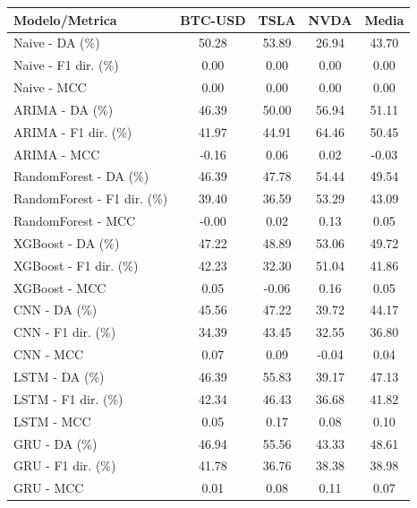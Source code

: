 \begin{tabular}{l|ccc|c}
\hline
\textbf{Modelo/Metrica} & \textbf{BTC-USD} & \textbf{TSLA} & \textbf{NVDA} & \textbf{Media} \\
\hline
Naive - DA (\%) & 50.28 & 53.89 & 26.94 & 43.70 \\
Naive - F1 dir. (\%) & 0.00 & 0.00 & 0.00 & 0.00 \\
Naive - MCC & 0.00 & 0.00 & 0.00 & 0.00 \\
ARIMA - DA (\%) & 46.39 & 50.00 & 56.94 & 51.11 \\
ARIMA - F1 dir. (\%) & 41.97 & 44.91 & 64.46 & 50.45 \\
ARIMA - MCC & -0.16 & 0.06 & 0.02 & -0.03 \\
RandomForest - DA (\%) & 46.39 & 47.78 & 54.44 & 49.54 \\
RandomForest - F1 dir. (\%) & 39.40 & 36.59 & 53.29 & 43.09 \\
RandomForest - MCC & -0.00 & 0.02 & 0.13 & 0.05 \\
XGBoost - DA (\%) & 47.22 & 48.89 & 53.06 & 49.72 \\
XGBoost - F1 dir. (\%) & 42.23 & 32.30 & 51.04 & 41.86 \\
XGBoost - MCC & 0.05 & -0.06 & 0.16 & 0.05 \\
CNN - DA (\%) & 45.56 & 47.22 & 39.72 & 44.17 \\
CNN - F1 dir. (\%) & 34.39 & 43.45 & 32.55 & 36.80 \\
CNN - MCC & 0.07 & 0.09 & -0.04 & 0.04 \\
LSTM - DA (\%) & 46.39 & 55.83 & 39.17 & 47.13 \\
LSTM - F1 dir. (\%) & 42.34 & 46.43 & 36.68 & 41.82 \\
LSTM - MCC & 0.05 & 0.17 & 0.08 & 0.10 \\
GRU - DA (\%) & 46.94 & 55.56 & 43.33 & 48.61 \\
GRU - F1 dir. (\%) & 41.78 & 36.76 & 38.38 & 38.98 \\
GRU - MCC & 0.01 & 0.08 & 0.11 & 0.07 \\
\hline
\end{tabular}